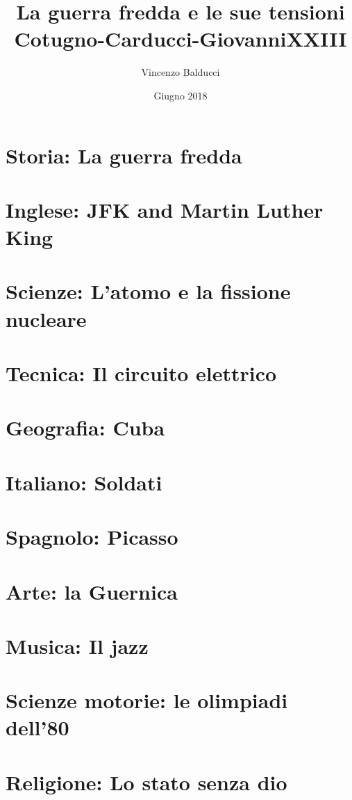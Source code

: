 \documentclass[12pt,twoside]{report}
\title{
  {La guerra fredda e le sue tensioni}\\
  {\large Cotugno-Carducci-GiovanniXXIII}
}
\author{Vincenzo Balducci}
\date{Giugno 2018}
\begin{document}
\maketitle

\tableofcontents

\chapter{Storia: La guerra fredda}


\chapter{Inglese: JFK and Martin Luther King}


\chapter{Scienze: L'atomo e la fissione nucleare}


\chapter{Tecnica: Il circuito elettrico}


\chapter{Geografia: Cuba}


\chapter{Italiano: Soldati}



\chapter{Spagnolo: Picasso}


\chapter{Arte: la Guernica}


\chapter{Musica: Il jazz}


\chapter{Scienze motorie: le olimpiadi dell'80}


\chapter{Religione: Lo stato senza dio}

\end{document}
